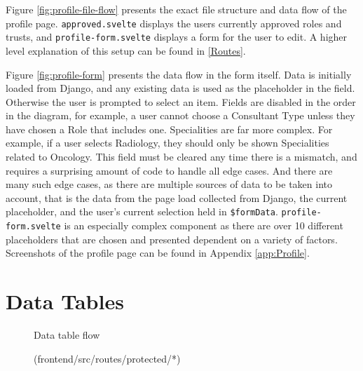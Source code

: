 Figure \ref{fig:profile-file-flow} presents the exact file structure and data flow of the profile page. \texttt{approved.svelte} displays the users currently approved roles and trusts, and \texttt{profile-form.svelte} displays a form for the user to edit. A higher level explanation of this setup can be found in \ref{Routes}. 

Figure \ref{fig:profile-form} presents the data flow in the form itself. Data is initially loaded from Django, and any existing data is used as the placeholder in the field. Otherwise the user is prompted to select an item. Fields are disabled in the order in the diagram, for example, a user cannot choose a Consultant Type unless they have chosen a Role that includes one. Specialities are far more complex. For example, if a user selects Radiology, they should only be shown Specialities related to Oncology. This field must be cleared any time there is a mismatch, and requires a surprising amount of code to handle all edge cases. And there are many such edge cases, as there are multiple sources of data to be taken into account, that is the data from the page load collected from Django, the current placeholder, and the user's current selection held in \texttt{\$formData}. \texttt{profile-form.svelte} is an especially complex component as there are over 10 different placeholders that are chosen and presented dependent on a variety of factors. Screenshots of the profile page can be found in Appendix \ref{app:Profile}.

\section{Data Tables}
\begin{figure}[h]
\centering
{}
\vspace{-20pt}
\caption{Data table flow}
\vspace{-10pt}
\caption*{(frontend/src/routes/protected/*)}
\label{fig:data-table-flow}
\vspace{-5pt}
\end{figure}

